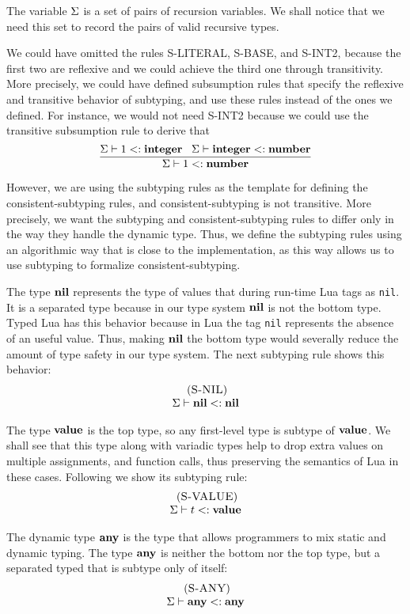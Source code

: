 The variable $\Sigma$ is a set of pairs of recursion variables.
We shall notice that we need this set to record the pairs of valid
recursive types.

We could have omitted the rules \textsc{S-LITERAL}, \textsc{S-BASE},
and \textsc{S-INT2}, because the first two are reflexive and we
could achieve the third one through transitivity.
More precisely, we could have defined subsumption rules that
specify the reflexive and transitive behavior of subtyping,
and use these rules instead of the ones we defined.
For instance, we would not need \textsc{S-INT2} because we could
use the transitive subsumption rule to derive that
\[
\dfrac{\Sigma \vdash 1 <: \mathbf{integer} \;\;\;
       \Sigma \vdash \mathbf{integer} <: \mathbf{number}}
      {\Sigma \vdash 1 <: \mathbf{number}}
\]

However, we are using the subtyping rules as the template for defining
the consistent-subtyping rules, and consistent-subtyping is not
transitive.
More precisely, we want the subtyping and consistent-subtyping rules
to differ only in the way they handle the dynamic type.
Thus, we define the subtyping rules using an algorithmic
way that is close to the implementation, as this way allows us to use
subtyping to formalize consistent-subtyping.

The type $\mathbf{nil}$ represents the type of values that during run-time
Lua tags as \texttt{nil}.
It is a separated type because in our type system $\mathbf{nil}$ is
not the bottom type.
Typed Lua has this behavior because in Lua the tag \texttt{nil}
represents the absence of an useful value.
Thus, making $\mathbf{nil}$ the bottom type would severally reduce the
amount of type safety in our type system.
The next subtyping rule shows this behavior:
\[
\begin{array}{c}
\; (\textsc{S-NIL})\\
\Sigma \vdash \mathbf{nil} <: \mathbf{nil}
\end{array}
\]

The type $\mathbf{value}$ is the top type, so any first-level type is
subtype of $\mathbf{value}$.
We shall see that this type along with variadic types help to
drop extra values on multiple assignments, and function calls,
thus preserving the semantics of Lua in these cases.
Following we show its subtyping rule:
\[
\begin{array}{c}
\; (\textsc{S-VALUE})\\
\Sigma \vdash t <: \mathbf{value}
\end{array}
\]

The dynamic type $\mathbf{any}$ is the type that allows programmers to mix
static and dynamic typing.
The type $\mathbf{any}$ is neither the bottom nor the top type, but a
separated typed that is subtype only of itself:
\[
\begin{array}{c}
\; (\textsc{S-ANY})\\
\Sigma \vdash \mathbf{any} <: \mathbf{any}
\end{array}
\]


